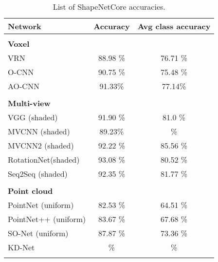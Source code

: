 \begin{table}[]
	\centering
	\begin{tabular}{lcc}
		\hline
		\textbf{Network}       & \textbf{Accuracy } & \textbf{Avg class accuracy } \\ \hline
		                       &                    &                              \\
		\textbf{Voxel }        &                    &                              \\
		VRN                    &      88.98 \%      &           76.71 \%           \\
		O-CNN                  &      90.75 \%      &           75.48 \%           \\
		AO-CNN                 &      91.33\%       &           77.14\%            \\
		                       &                    &                              \\
		\textbf{Multi-view }   &                    &                              \\
		VGG (shaded)           &      91.90 \%      &           81.0 \%            \\
		MVCNN (shaded)         &      89.23\%       &              \%              \\
		MVCNN2 (shaded)        &      92.22 \%      &           85.56 \%           \\
		RotationNet(shaded)    &      93.08 \%      &           80.52 \%           \\
		Seq2Seq (shaded)       &      92.35 \%      &            81.77 \%              \\
		                       &                    &                              \\
		\textbf{Point cloud  } &                    &                              \\
		PointNet (uniform)     &      82.53 \%      &           64.51 \%           \\
		PointNet++ (uniform)   &      83.67 \%      &           67.68 \%           \\
		SO-Net (uniform)       &      87.87 \%      &           73.36 \%           \\
		KD-Net                 &         \%         &              \%              \\
		                       &                    &                              \\ \hline
	\end{tabular}
\caption{List of ShapeNetCore accuracies.}
\label{Table:saccs}
\end{table}